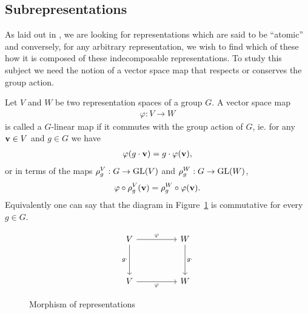 \subsection{Subrepresentations}

As laid out in \cite{FultonHarris}, we are looking for representations which are said to be ``atomic'' and conversely, for any arbitrary representation, we wish to find which of these how it is composed of these indecomposable representations. To study this subject we need the notion of a vector space map that respects or conserves the group action.	


\begin{definition}\cite{FultonHarris}
	Let $V$ and $W$ be two representation spaces of a group $G$. A vector space map 
	\begin{align*}
		\varphi: V \rightarrow W
	\end{align*} 
	is called a $G$-linear map if it commutes with the group action of $G$, ie. for any $\mathbf{v} \in V$ and $g \in G$ we have
	\begin{align*}
		\varphi( g \cdot \mathbf{v} ) = g \cdot \varphi (\mathbf{v}),
	\end{align*}
	or in terms of the maps $\rho_g^V: G \rightarrow \text{GL}(V)$ and $\rho_g^W: G \rightarrow \text{GL}(W)$,
	\begin{align*}
		\varphi \circ \rho^V_g (\mathbf{v}) = \rho^W_g \circ \varphi (\mathbf{v}).
	\end{align*}
	Equivalently one can say that the diagram in Figure~\ref*{fig:commapmorp} is commutative for every $g \in G$.
	\begin{figure}[hbt!]
		\centering
		\[\begin{tikzcd}
			V && W \\
			\\
			V && W
			\arrow["\varphi", from=1-1, to=1-3]
			\arrow["g\cdot"', from=1-1, to=3-1]
			\arrow["g\cdot", from=1-3, to=3-3]
			\arrow["\varphi"', from=3-1, to=3-3]
		\end{tikzcd}\]
		\caption{Morphism of representations}
		\label{fig:commapmorp}
	\end{figure}
\end{definition}

